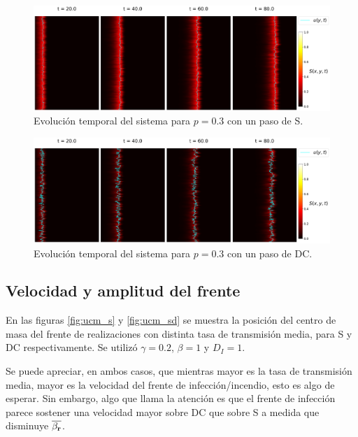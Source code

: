 \begin{figure}[h]
    \centering
    \includegraphics[width=\imsizeL]{suavizada_tevol.pdf}
    \caption{Evolución temporal del sistema para $p=0.3$ con un paso de S.}
    \label{fig:suavizada}
\end{figure}

\begin{figure}[h]
    \centering
    \includegraphics[width=\imsizeL]{suavizada_dic_tevol.pdf}
    \caption{Evolución temporal del sistema para $p=0.3$ con un paso de DC.}
    \label{fig:suavizada-dicotómica}
\end{figure}

\subsection{Velocidad y amplitud del frente}

En las figuras \ref{fig:ucm_s} y \ref{fig:ucm_sd} se muestra la posición del centro de masa del frente de realizaciones con distinta tasa 
de transmisión media, para S y DC respectivamente. Se utilizó $\gamma=0.2$, $\beta=1$ y $D_I=1$. 

Se puede apreciar, en ambos casos, que mientras mayor es la tasa 
de transmisión media, mayor es la velocidad del frente de infección/incendio, esto es algo de esperar. Sin embargo, algo que llama la atención 
es que el frente de infección parece sostener una velocidad mayor sobre DC que sobre S a medida que disminuye $\overline{\beta_{\vb r}}$.


